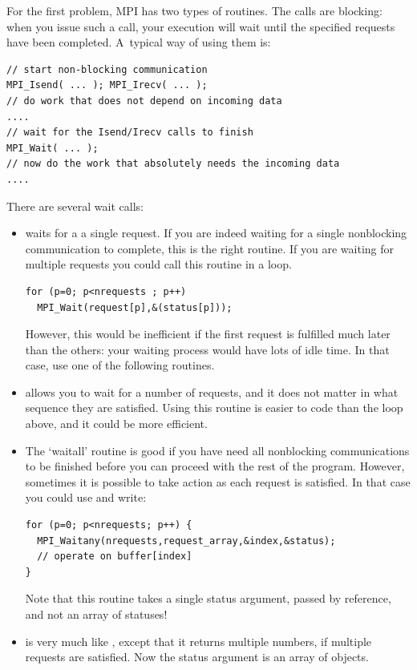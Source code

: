 For the first problem, MPI has two types of
routines. The  calls are blocking: when you issue
such a call, your execution will wait until the specified requests
have been completed. A~typical way of using them is:
\begin{verbatim}
// start non-blocking communication
MPI_Isend( ... ); MPI_Irecv( ... );
// do work that does not depend on incoming data
....
// wait for the Isend/Irecv calls to finish
MPI_Wait( ... );
// now do the work that absolutely needs the incoming data
....
\end{verbatim}
There are several wait calls:
\begin{itemize}
\item {} waits for a a single request. If you are
  indeed waiting for a single nonblocking communication to complete,
  this is the right routine. If you are waiting for multiple requests
  you could call this routine in a loop. 
\begin{verbatim}
for (p=0; p<nrequests ; p++)
  MPI_Wait(request[p],&(status[p]));
\end{verbatim}
  However, this would be inefficient if the first request is fulfilled much later than 
  the others: your waiting process would have lots of idle time. In that case,
  use one of the following routines.
\item {} allows you to wait for a number of
  requests, and it does not matter in what sequence they are
  satisfied. Using this routine is easier to code than the loop above,
  and it could be more efficient.
\item The `waitall' routine is good if you have need all nonblocking
  communications to be finished before you can proceed with the rest
  of the program. However, sometimes it is possible to take action as
  each request is satisfied. In that case you could use
   and write:
\begin{verbatim}
for (p=0; p<nrequests; p++) {
  MPI_Waitany(nrequests,request_array,&index,&status);
  // operate on buffer[index]
}
\end{verbatim}
  Note that this routine takes a single status argument, passed by reference,
  and not an array of statuses!
\item {} is very much like ,
  except that it returns multiple numbers, if multiple requests are
  satisfied. Now the status argument is an array of  objects.
\end{itemize}

